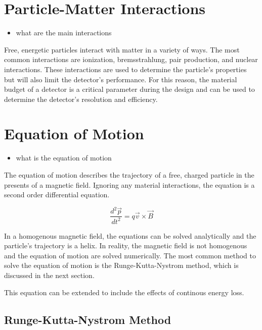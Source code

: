\section{Particle-Matter Interactions}

\begin{itemize}
    \color{red}
    \item what are the main interactions
\end{itemize}

Free, energetic particles interact with matter in a variety of ways. The most common interactions are ionization, bremsstrahlung, pair production, and nuclear interactions. These interactions are used to determine the particle's properties but will also limit the detector's performance. For this reason, the material budget of a detector is a critical parameter during the design and can be used to determine the detector's resolution and efficiency.

\section{Equation of Motion}

\begin{itemize}
    \color{red}
    \item what is the equation of motion
\end{itemize}

The equation of motion describes the trajectory of a free, charged particle in the presents of a magnetic field. Ignoring any material interactions, the equation is a second order differential equation.

\begin{equation}
    \frac{d^2\vec{p}}{dt^2} = q \vec{v} \times \vec{B}
\end{equation}

In a homogenous magnetic field, the equations can be solved analytically and the particle's trajectory is a helix. In reality, the magnetic field is not homogenous and the equation of motion are solved numerically. The most common method to solve the equation of motion is the Runge-Kutta-Nystrom method, which is discussed in the next section.

This equation can be extended to include the effects of continous energy loss.

\subsection{Runge-Kutta-Nystrom Method}

